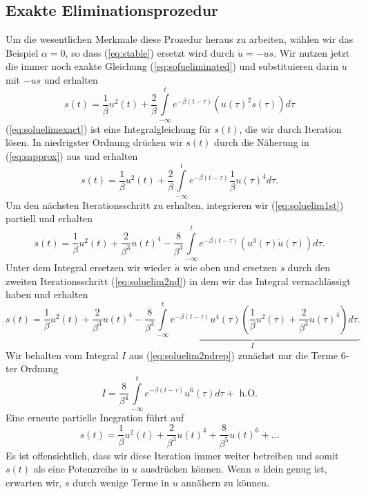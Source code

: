 \subsection{Exakte Eliminationsprozedur}
Um die wesentlichen Merkmale diese Prozedur heraus zu arbeiten, wählen wir das
Beispiel $\alpha=0$, so dass (\ref{eq:stable}) ersetzt wird durch $\dot u=-us$.
Wir nutzen jetzt die immer noch exakte Gleichung (\ref{eq:sofueliminated}) und
substituieren darin $\dot u$ mit $-us$ und erhalten
\begin{equation}
  s(t)=\frac{1}{\beta}u^2(t)+\frac{2}{\beta}\int\limits_{-\infty}^{t}e^{-\beta(t-\tau)}
  (u(\tau)^2 s(\tau))d\tau
  \label{eq:soluelimexact}
\end{equation}
(\ref{eq:soluelimexact}) ist eine Integralgleichung für $s(t)$, die wir durch
Iteration lösen. In niedrigster Ordnung drücken wir $s(t)$ durch die Näherung
in (\ref{eq:sapprox}) aus und erhalten
\begin{equation}
  s(t)=\frac{1}{\beta}u^2(t)+\frac{2}{\beta}\int\limits_{-\infty}^{t}e^{-\beta(t-\tau)}
  \frac{1}{\beta}u(\tau)^4d\tau .
  \label{eq:soluelim1st}
\end{equation}
Um den nächsten Iterationsschritt zu erhalten, integrieren wir
(\ref{eq:soluelim1st}) partiell und erhalten 
\begin{equation}
  s(t)=\frac{1}{\beta}u^2(t)+\frac{2}{\beta^3}u(t)^4-
  \frac{8}{\beta^3}\int\limits_{-\infty}^{t}e^{-\beta(t-\tau)}
  (u^3(\tau)\dot u(\tau))d\tau .
  \label{eq:soluelim2nd}
\end{equation}
Unter dem Integral ersetzen wir wieder $\dot u$ wie oben und ersetzen $s$ durch
den zweiten Iterationsschritt (\ref{eq:soluelim2nd}) in dem wir das Integral
vernachlässigt haben und erhalten
\begin{equation}
  s(t)=\frac{1}{\beta}u^2(t)+\frac{2}{\beta^3}u(t)^4-
  \underbrace{
    \frac{8}{\beta^3}\int\limits_{-\infty}^{t}e^{-\beta(t-\tau)}u^4(\tau)
  \left(\frac{1}{\beta}u^2(\tau)+\frac{2}{\beta^3}u(\tau)^4\right)d\tau .
  }_{I}
  \label{eq:soluelim2ndrep}
\end{equation}
Wir behalten vom Integral $I$ aus (\ref{eq:soluelim2ndrep}) zunächst nur die
Terme 6-ter Ordnung
\[ 
  I=\frac{8}{\beta^4}\int\limits_{-\infty}^{t}e^{-\beta(t-\tau)}
  u^6(\tau)d\tau+\text{ h.O.}
\]
Eine erneute partielle Inegration führt auf
\[ 
  s(t)=\frac{1}{\beta}u^2(t)+\frac{2}{\beta^3}u(t)^4+\frac{8}{\beta^5}u(t)^6+\dots
\]
Es ist offensichtlich, dass wir diese Iteration immer weiter betreiben und
somit $s(t)$ als eine Potenzreihe in $u$ ausdrücken können. Wenn $u$ klein
genug ist, erwarten wir, $s$ durch wenige Terme in $u$ annähern zu können.

